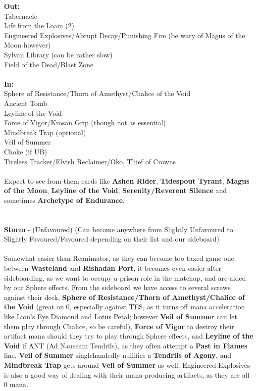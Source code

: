 \documentclass{report}
\begin{document}
\textbf{Out:}\\
Tabernacle\\Life from the Loam (2)\\Engineered Explosives/Abrupt Decay/Punishing Fire (be wary of Magus of the Moon however)\\Sylvan Library (can be rather slow)\\Field of the Dead/Blast Zone\\\\
\textbf{In:}\\
Sphere of Resistance/Thorn of Amethyst/Chalice of the Void\\Ancient Tomb\\Leyline of the Void\\Force of Vigor/Krosan Grip (though not as essential)\\Mindbreak Trap (optional)\\Veil of Summer\\Choke (if UB)\\Tireless Tracker/Elvish Reclaimer/Oko, Thief of Crowns\\\\
Expect to see from them cards like \textbf{Ashen Rider}, \textbf{Tidespout Tyrant}, \textbf{Magus of the Moon}, \textbf{Leyline of the Void}, \textbf{Serenity/Reverent Silence} and sometimes \textbf{Archetype of Endurance}.\\\\\\
\textbf{Storm} - (Unfavoured) (Can become anywhere from Slightly Unfavoured to Slightly Favoured/Favoured depending on their list and our sideboard)\\\\
Somewhat easier than Reanimator, as they can become too taxed game one between \textbf{Wasteland} and \textbf{Rishadan Port}, it becomes even easier after sideboarding, as we want to occupy a prison role in the matchup, and are aided by our Sphere effects. From the sideboard we have access to several screws against their deck, \textbf{Sphere of Resistance/Thorn of Amethyst/Chalice of the Void} (great on 0, especially against TES, as it turns off mana acceleration like Lion's Eye Diamond and Lotus Petal; however \textbf{Veil of Summer} can let them play through Chalice, so be careful), \textbf{Force of Vigor} to destroy their artifact mana should they try to play through Sphere effects, and \textbf{Leyline of the Void} if ANT (Ad Nauseam Tendrils), as they often attempt a \textbf{Past in Flames} line. \textbf{Veil of Summer} singlehandedly nullifies a \textbf{Tendrils of Agony}, and \textbf{Mindbreak Trap} gets around \textbf{Veil of Summer} as well. Engineered Explosives is also a good way of dealing with their mana producing artifacts, as they are all 0 mana.
\end{document}
